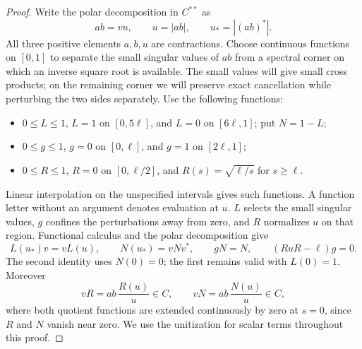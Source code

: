 \begin{proof}
Write the polar decomposition in $C^{**}$ as
\[
 ab=vu,\qquad u=|ab|,\qquad u_*=|(ab)^*|.
\]
All three positive elements $a,b,u$ are contractions.  Choose continuous
functions on $[0,1]$ to separate the small singular values of $ab$
from a spectral corner on which an inverse square root is available.
The small values will give small cross products; on the remaining
corner we will preserve exact cancellation while perturbing the two
sides separately.  Use the following functions:
\begin{itemize}
\item $0\le L\le1$, $L=1$ on $[0,5\ell]$, and $L=0$ on
      $[6\ell,1]$; put $N=1-L$;
\item $0\le g\le1$, $g=0$ on $[0,\ell]$, and $g=1$ on
      $[2\ell,1]$;
\item $0\le R\le1$, $R=0$ on $[0,\ell/2]$, and
      $R(s)=\sqrt{\ell/s}$ for $s\ge\ell$.
\end{itemize}
Linear interpolation on the unspecified intervals gives such functions.
A function letter without an argument denotes evaluation at $u$.
$L$ selects the small singular values, $g$ confines the perturbations
away from zero, and $R$ normalizes $u$ on that region.
Functional calculus and the polar decomposition give
\begin{equation}\label{eq:separation-functional-identities}
 L(u_*)v=vL(u),\qquad N(u_*)=vNv^*,\qquad
 gN=N,\qquad (RuR-\ell)g=0.
\end{equation}
The second identity uses $N(0)=0$; the first remains valid with
$L(0)=1$.  Moreover
\[
 vR=ab\,\frac{R(u)}u\in C,\qquad
 vN=ab\,\frac{N(u)}u\in C,
\]
where both quotient functions are extended continuously by zero at
$s=0$, since $R$ and $N$ vanish near zero.
We use the unitization for scalar terms throughout this proof.


\end{proof}
